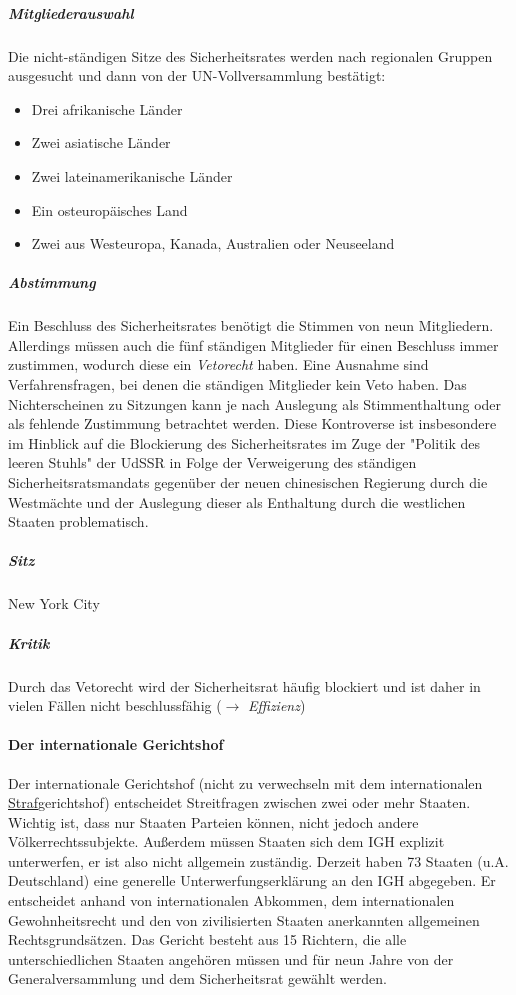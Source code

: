 \documentclass{article}
\begin{document}
	\subparagraph{Mitgliederauswahl}
	Die nicht-ständigen Sitze des Sicherheitsrates  werden nach regionalen Gruppen ausgesucht und dann von der UN-Vollversammlung bestätigt:

	\begin{itemize}
		\item Drei afrikanische Länder
		\item Zwei asiatische Länder
		\item Zwei lateinamerikanische Länder
		\item Ein osteuropäisches Land
		\item Zwei aus Westeuropa, Kanada, Australien oder Neuseeland
	\end{itemize}

	\subparagraph{Abstimmung}
	Ein Beschluss des Sicherheitsrates benötigt die Stimmen von neun Mitgliedern. Allerdings müssen auch die fünf ständigen Mitglieder für einen Beschluss immer zustimmen, wodurch diese ein \textit{Vetorecht} haben. Eine Ausnahme sind Verfahrensfragen, bei denen die ständigen Mitglieder kein Veto haben. Das Nichterscheinen zu Sitzungen kann je nach Auslegung als Stimmenthaltung oder als fehlende Zustimmung betrachtet werden. Diese Kontroverse ist insbesondere im Hinblick auf die Blockierung des Sicherheitsrates im Zuge der "Politik des leeren Stuhls" der UdSSR in Folge der Verweigerung des ständigen Sicherheitsratsmandats gegenüber der neuen chinesischen Regierung durch die Westmächte und der Auslegung dieser als Enthaltung durch die westlichen Staaten problematisch.

	\subparagraph{Sitz}
	New York City

	\subparagraph{Kritik}
	Durch das Vetorecht wird der Sicherheitsrat häufig blockiert und ist daher in vielen Fällen nicht beschlussfähig ($\rightarrow$ \textit{Effizienz})

	\paragraph{Der internationale Gerichtshof}
	Der internationale Gerichtshof (nicht zu verwechseln mit dem internationalen \underline{Straf}gerichtshof) entscheidet Streitfragen zwischen zwei oder mehr Staaten. Wichtig ist, dass nur Staaten Parteien können, nicht jedoch andere Völkerrechtssubjekte. Außerdem müssen Staaten sich dem IGH explizit unterwerfen, er ist also nicht allgemein zuständig. Derzeit haben 73 Staaten (u.A. Deutschland) eine generelle Unterwerfungserklärung an den IGH abgegeben. Er entscheidet anhand von internationalen Abkommen, dem internationalen Gewohnheitsrecht und den von zivilisierten Staaten anerkannten allgemeinen Rechtsgrundsätzen. Das Gericht besteht aus 15 Richtern, die alle unterschiedlichen Staaten angehören müssen und für neun Jahre von der Generalversammlung und dem Sicherheitsrat gewählt werden.
\end{document}
